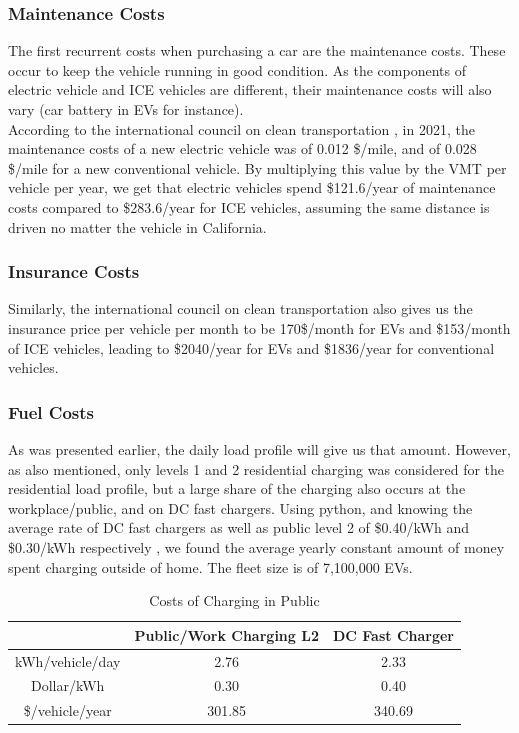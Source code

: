 \documentclass{article}
\begin{document}
\subsubsection{Maintenance Costs}

The first recurrent costs when purchasing a car are the maintenance costs. These occur to keep the vehicle running in good condition. As the components of electric vehicle and ICE vehicles are different, their maintenance costs will also vary (car battery in EVs for instance). \\

According to the international council on clean transportation \cite{Maintenance/InsuranceCosts}, in 2021, the maintenance costs of a new electric vehicle was of 0.012 \$/mile, and of 0.028 \$/mile for a new conventional vehicle. By multiplying this value by the VMT per vehicle per year, we get that electric vehicles spend \$121.6/year of maintenance costs compared to \$283.6/year for ICE vehicles, assuming the same distance is driven no matter the vehicle in California.

\subsubsection{Insurance Costs}

Similarly, the international council on clean transportation also gives us the insurance price per vehicle per month \cite{Maintenance/InsuranceCosts} to be 170\$/month for EVs and \$153/month of ICE vehicles, leading to \$2040/year for EVs and \$1836/year for conventional vehicles. 

\subsubsection{Fuel Costs}

As was presented earlier, the daily load profile will give us that amount. However, as also mentioned, only levels 1 and 2 residential charging was considered for the residential load profile, but a large share of the charging also occurs at the workplace/public, and on DC fast chargers. Using python, and knowing the average rate of DC fast chargers as well as public level 2 of \$0.40/kWh and \$0.30/kWh respectively \cite{DriveClean}, we found the average yearly constant amount of money spent charging outside of home. The fleet size is of 7,100,000 EVs. 

\begin{table}[H]
    \centering
    \begin{tabular}{|c|c|c|}\hline
         &  Public/Work Charging L2& DC Fast Charger\\\hline
         kWh/vehicle/day&  2.76& 2.33\\\hline
         Dollar/kWh&  0.30& 0.40\\\hline
 \$/vehicle/year& 301.85&340.69\\\hline
    \end{tabular}
    \caption{Costs of Charging in Public}
    \label{DCFC/publiccharging}
\end{table}
\end{document}
